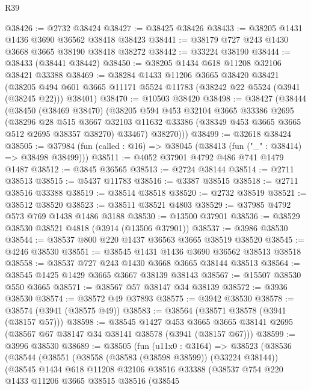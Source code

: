 \begin{lexlean}{R39}
\begin{coremodule}
@38426 := @2732 @38424
@38427 := @38425 @38426
@38433 := @38205 @1431 @1436 @3690 @36562 @38418 @38423
@38441 := @38179 @727 @243 @1430 @3668 @3665 @38190 @38418 @38272
@38442 := @33224 @38190
@38444 := @38433 (@38441 @38442)
@38450 := @38205 @1434 @618 @11208 @32106 @38421 @33388
@38469 := @38284
    @1433
    @11206
    @3665
    @38420
    @38421
    (@38205 @494 @601 @3665 @11171 @5524 @11783 (@38242 @22 @5524 (@3941 (@38245 @22))) @38401)
@38470 := @10503 @38420
@38498 := @38427
    (@38444
      (@38450
        (@38469 @38470)
        (@38205
          @594
          @453
          @32104
          @3665
          @33386
          @2695
          (@38296
            @28
            @515
            @3667
            @32103
            @11632
            @33386
            (@38349 @453 @3665 @3665 @512 @2695 @38357 @38270)
            @33467)
          @38270)))
@38499 := @32618 @38424
@38505 := @37984 (fun (called : @16) => @38045 (@38413 (fun ("_" : @38414) => @38498 @38499)))
@38511 := @4052 @37901 @4792 @486 @741 @1479 @1487
@38512 := @3845 @36565
@38513 := @2724 @38144
@38514 := @2711 @38513
@38515 := @5437 @11783
@38516 := @3387 @38515
@38518 := @2711 @38516 @33388
@38519 := @38514 @38518
@38520 := @2732 @38519
@38521 := @38512 @38520
@38523 := @38511 @38521 @4803
@38529 := @37985 @4792 @573 @769 @1438 @1486 @3188
@38530 := @13500 @37901
@38536 := @38529 @38530 @38521 @4818 (@3914 (@13506 @37901))
@38537 := @3986 @38530
@38544 := @38537 @800 @220 @1437 @36563 @3665 @38519 @38520
@38545 := @4246 @38530
@38551 := @38545 @1431 @1436 @3690 @36562 @38513 @38518
@38558 := @38537 @727 @243 @1430 @3668 @3665 @38144 @38513
@38564 := @38545 @1425 @1429 @3665 @3667 @38139 @38143
@38567 := @15507 @38530 @550 @3665
@38571 := @38567 @57 @38147 @34 @38139
@38572 := @3936 @38530
@38574 := @38572 @49 @37893
@38575 := @3942 @38530
@38578 := @38574 (@3941 (@38575 @49))
@38583 := @38564 (@38571 @38578 (@3941 (@38157 @57)))
@38598 := @38545
    @1427
    @453
    @3665
    @3665
    @38141
    @2695
    (@38567 @67 @38147 @34 @38141 @38578 (@3941 (@38157 @67)))
@38599 := @3996 @38530
@38689 := @38505
    (fun (u11x0 : @3164) =>
    @38523
      (@38536
        (@38544
          (@38551
            (@38558 (@38583 (@38598 @38599)) (@33224 @38144))
            (@38545
              @1434
              @618
              @11208
              @32106
              @38516
              @33388
              (@38537
                @754
                @220
                @1433
                @11206
                @3665
                @38515
                @38516
                (@38545

\end{coremodule}
\end{lexlean}
